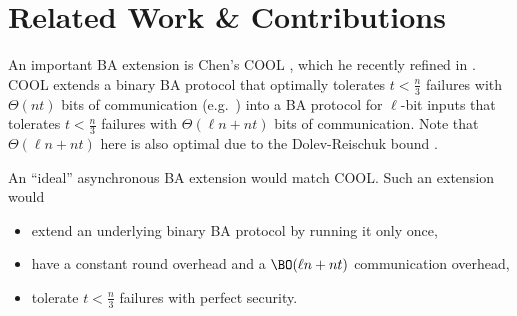 \section{Related Work \& Contributions}
An important BA extension is Chen's COOL \cite{chen21}, which he recently refined in \cite{chen24}. COOL extends a binary BA protocol that optimally \cite{psl80,t84} tolerates $t < \frac{n}{3}$ failures with $\Theta(nt)$ bits of communication (e.g.\ \cite{bgp92}) into a BA protocol for $\ell$-bit inputs that tolerates $t < \frac{n}{3}$ failures with $\Theta(\ell n + nt)$ bits of communication. Note that $\Theta(\ell n + nt)$ here is also optimal due to the Dolev-Reischuk bound \cite{dr85, acdnprs22}.

An ``ideal'' asynchronous BA extension would match COOL. Such an extension would \begin{itemize}
    \item extend an underlying binary BA protocol by running it only once, 
    \item have a constant round overhead and a $\BO(\ell n + nt)$ communication overhead,
    \item tolerate $t < \frac{n}{3}$ failures with perfect security.
\end{itemize}

